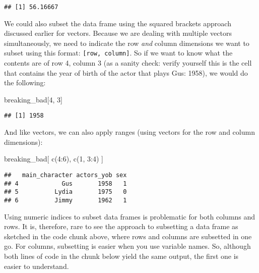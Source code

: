 \documentclass[
]{article}
\newenvironment{Shaded}{\begin{snugshade}}{\end{snugshade}}
\newcommand{\DecValTok}[1]{\textcolor[rgb]{0.00,0.00,0.81}{#1}}
\newcommand{\FunctionTok}[1]{\textcolor[rgb]{0.00,0.00,0.00}{#1}}
\newcommand{\NormalTok}[1]{#1}
\newcommand{\SpecialCharTok}[1]{\textcolor[rgb]{0.00,0.00,0.00}{#1}}
\begin{document}
\begin{verbatim}
## [1] 56.16667
\end{verbatim}

We could also subset the data frame using the squared brackets approach
discussed earlier for vectors. Because we are dealing with multiple
vectors simultaneously, we need to indicate the row \emph{and} column
dimensions we want to subset using this format:
\texttt{{[}row,\ column{]}}. So if we want to know what the contents are
of row 4, column 3 (as a sanity check: verify yourself this is the cell
that contains the year of birth of the actor that plays Gus: 1958), we
would do the following:

\begin{Shaded}
\begin{Highlighting}[]
\NormalTok{breaking\_bad[}\DecValTok{4}\NormalTok{, }\DecValTok{3}\NormalTok{]}
\end{Highlighting}
\end{Shaded}

\begin{verbatim}
## [1] 1958
\end{verbatim}

And like vectors, we can also apply ranges (using vectors for the row
and column dimensions):

\begin{Shaded}
\begin{Highlighting}[]
\NormalTok{breaking\_bad[ }\FunctionTok{c}\NormalTok{(}\DecValTok{4}\SpecialCharTok{:}\DecValTok{6}\NormalTok{), }\FunctionTok{c}\NormalTok{(}\DecValTok{1}\NormalTok{, }\DecValTok{3}\SpecialCharTok{:}\DecValTok{4}\NormalTok{) ]}
\end{Highlighting}
\end{Shaded}

\begin{verbatim}
##   main_character actors_yob sex
## 4            Gus       1958   1
## 5          Lydia       1975   0
## 6          Jimmy       1962   1
\end{verbatim}

Using numeric indices to subset data frames is problematic for both
columns and rows. It is, therefore, rare to see the approach to
subsetting a data frame as sketched in the code chunk above, where rows
and columns are subsetted in one go. For columns, subsetting is easier
when you use variable names. So, although both lines of code in the
chunk below yield the same output, the first one is easier to
understand.
\end{document}

